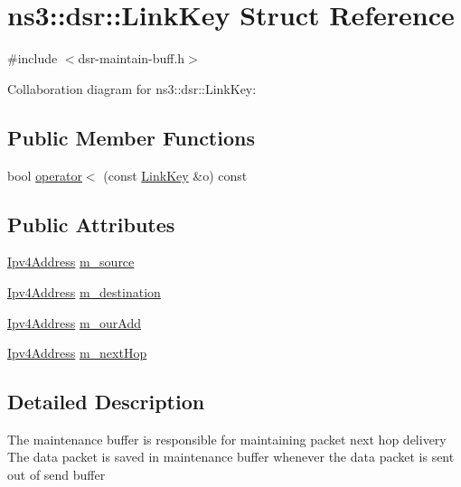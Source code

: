 \hypertarget{structns3_1_1dsr_1_1LinkKey}{}\section{ns3\+:\+:dsr\+:\+:Link\+Key Struct Reference}
\label{structns3_1_1dsr_1_1LinkKey}


{\ttfamily \#include $<$dsr-\/maintain-\/buff.\+h$>$}



Collaboration diagram for ns3\+:\+:dsr\+:\+:Link\+Key\+:
\subsection*{Public Member Functions}
\begin{DoxyCompactItemize}
\item 
bool \hyperlink{structns3_1_1dsr_1_1LinkKey_acd474d21b77e2f0599c713a0a94bc6ac}{operator$<$} (const \hyperlink{structns3_1_1dsr_1_1LinkKey}{Link\+Key} \&o) const 
\end{DoxyCompactItemize}
\subsection*{Public Attributes}
\begin{DoxyCompactItemize}
\item 
\hyperlink{classns3_1_1Ipv4Address}{Ipv4\+Address} \hyperlink{structns3_1_1dsr_1_1LinkKey_a522ac967540e9db2425ca20c43e30f45}{m\+\_\+source}
\item 
\hyperlink{classns3_1_1Ipv4Address}{Ipv4\+Address} \hyperlink{structns3_1_1dsr_1_1LinkKey_ae2c9c019b9faafceb5b840fc91c13673}{m\+\_\+destination}
\item 
\hyperlink{classns3_1_1Ipv4Address}{Ipv4\+Address} \hyperlink{structns3_1_1dsr_1_1LinkKey_a7d986790dade52e799e34ba79af2aa96}{m\+\_\+our\+Add}
\item 
\hyperlink{classns3_1_1Ipv4Address}{Ipv4\+Address} \hyperlink{structns3_1_1dsr_1_1LinkKey_afd2217721c7442503ebf6d708c1ca00a}{m\+\_\+next\+Hop}
\end{DoxyCompactItemize}


\subsection{Detailed Description}
The maintenance buffer is responsible for maintaining packet next hop delivery The data packet is saved in maintenance buffer whenever the data packet is sent out of send buffer 

